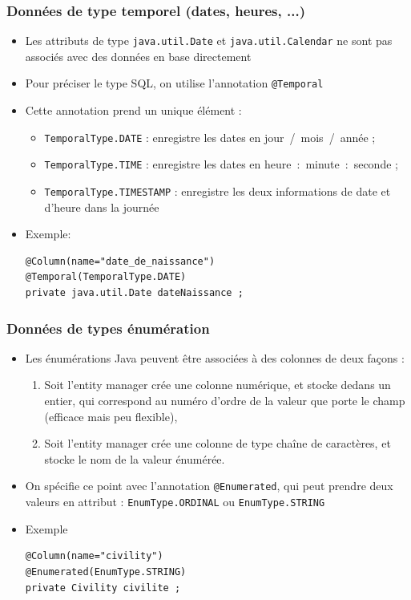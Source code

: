 \documentclass[aspectratio=169,10pt]{beamer}
\begin{document}
\begin{frame}[fragile]
	\frametitle{Données de type temporel (dates, heures, ...)}
	
	\begin{itemize}
		\item  Les attributs de type \texttt{java.util.Date} et \texttt{java.util.Calendar} ne sont pas associés avec des données en base directement
		\item Pour préciser le type SQL, on utilise l'annotation \texttt{@Temporal}
		\item Cette annotation prend un unique élément :
		\begin{itemize}
			\item \texttt{TemporalType.DATE} : enregistre les dates en jour~/~mois~/~année ; 
			\item \texttt{TemporalType.TIME} : enregistre les dates en heure~:~minute~:~seconde ;
			\item \texttt{TemporalType.TIMESTAMP} : enregistre les deux informations de date et d'heure dans la journée
		\end{itemize}
		\item Exemple:
\begin{lstlisting}
@Column(name="date_de_naissance")
@Temporal(TemporalType.DATE)
private java.util.Date dateNaissance ;
\end{lstlisting}
	\end{itemize}
	
\end{frame}

\begin{frame}[fragile]
	\frametitle{Données de types énumération}
	
	\begin{itemize}
		\item  Les énumérations Java peuvent être associées à des colonnes de deux façons : 
		\begin{enumerate}
			\item Soit l'entity manager crée une colonne numérique, et stocke dedans un entier, qui correspond au numéro d'ordre de la valeur que porte le champ (efficace mais peu flexible), 
			\item Soit l'entity manager crée une colonne de type chaîne de caractères, et stocke le nom de la valeur énumérée.
		\end{enumerate} 
		\item On spécifie ce point avec l'annotation \texttt{@Enumerated}, qui peut prendre deux valeurs en attribut : \texttt{EnumType.ORDINAL} ou \texttt{EnumType.STRING}
		\item Exemple
\begin{lstlisting}
@Column(name="civility")
@Enumerated(EnumType.STRING)
private Civility civilite ;
\end{lstlisting}
	\end{itemize}
	
\end{frame}
\end{document}
